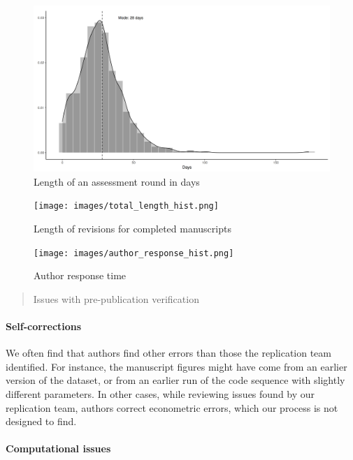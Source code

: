 \documentclass[PP]{AEA}
\begin{document}
\begin{figure}
    \centering
    \includegraphics[height=0.4\textheight]{images/revision_round_length_hist.png}
    \caption{Length of an assessment round in days}
    \label{fig:pre:round_length}
\end{figure}

\begin{figure}
    \centering
    \texttt{[image: images/total\_length\_hist.png]}
    \caption{Length of revisions for completed manuscripts}
    \label{fig:pre:revision_length}
\end{figure}




\begin{figure}
    \centering
    \texttt{[image: images/author\_response\_hist.png]}
    \caption{Author response time}
    \label{fig:pre:author_response_time}
\end{figure}

\begin{quote}
    Issues with pre-publication verification
\end{quote}

\paragraph{Self-corrections}

We often find that authors find other errors than those the replication team identified. For instance, the manuscript figures might have come from an earlier version of the dataset, or from an earlier run of the code sequence with slightly different parameters. In other cases, while reviewing issues found by our replication team, authors correct econometric errors, which our process is not designed to find. 

\paragraph{Computational issues}
\end{document}
